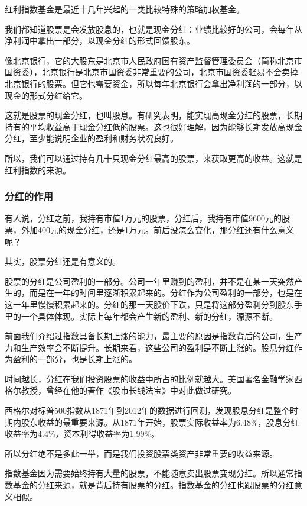 红利指数基金是最近十几年兴起的一类比较特殊的策略加权基金。

我们都知道股票是会发放股息的，也就是现金分红：业绩比较好的公司，会每年从净利润中拿出一部分，以现金分红的形式回馈股东。

{\kaishu 像北京银行，它的大股东是北京市人民政府国有资产监督管理委员会（简称北京市国资委），北京银行是北京市国资委非常重要的公司，北京市国资委轻易不会卖掉北京银行的股票。但它也需要资金，所以每年北京银行会拿出净利润的一部分，以现金的形式分红给它。}

这就是股票的现金分红，也叫股息。有研究表明，能实现高现金分红的股票，长期持有的平均收益高于现金分红低的股票。这也很好理解，因为能够长期发放高现金分红，至少能说明企业的盈利和财务状况良好。

所以，我们可以通过持有几十只现金分红最高的股票，来获取更高的收益。这就是红利指数的来源。

\subsubsection{分红的作用}

有人说，分红之前，我持有市值1万元的股票，分红后，我持有市值9600元的股票，外加400元的现金分红，还是1万元。前后没怎么变化，那分红还有什么意义呢？

其实，股票分红还是有意义的。

股票的分红是公司盈利的一部分。公司一年里赚到的盈利，并不是在某一天突然产生的，而是在一年的时间里逐渐积累起来的。分红作为公司盈利的一部分，也是在这一年里慢慢积累起来的。分红的那一天股价下跌，只是将这部分盈利分到股东手里的一个具体体现。实际上每年都会产生新的盈利、新的分红，源源不断。

前面我们介绍过指数具备长期上涨的能力，最主要的原因是指数背后的公司，生产力和生产效率会不断提升。长期来看，这些公司的盈利是不断上涨的。股息分红作为盈利的一部分，也是长期上涨的。

时间越长，分红在我们投资股票的收益中所占的比例就越大。美国著名金融学家西格尔教授，曾经在他的著作《股市长线法宝》中对此做过研究。

西格尔对标普500指数从1871年到2012年的数据进行回测，发现股息分红是整个时期内股东收益的最重要来源。从1871年开始，股票实际收益率为6.48\%，股息分红收益率为4.4\%，资本利得收益率为1.99\%。

所以分红绝不是多此一举，而是我们投资股票类资产非常重要的收益来源。

指数基金因为需要始终持有大量的股票，不能随意卖出股票变现分红。所以通常指数基金的分红来源，就是背后持有股票的分红。指数基金的分红也跟股票的分红意义相似。


